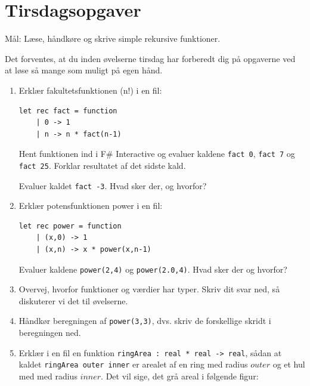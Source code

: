 \documentclass[a4paper,12pt]{article}
\begin{document}
\newpage
\section{Tirsdagsopgaver}
\label{sec:tirsdagsopgaver}

Mål: Læse, håndkøre og skrive simple rekursive funktioner.

Det forventes, at du inden øvelserne tirsdag har forberedt dig på
opgaverne ved at løse så mange som muligt på egen hånd.

\begin{enumerate}[{1}T1]
 \item Erklær fakultetsfunktionen (n!) i en fil:
\begin{Verbatim}[baselinestretch=0.8]
let rec fact = function
    | 0 -> 1
    | n -> n * fact(n-1)
\end{Verbatim}

Hent funktionen ind i F\# Interactive og evaluer kaldene \verb|fact 0|,
\verb|fact 7| og \verb|fact 25|. Forklar resultatet af det sidste
kald.

  Evaluer kaldet \verb|fact -3|. Hvad sker der, og hvorfor?
\item Erklær potensfunktionen power i en fil:
\begin{Verbatim}[baselinestretch=0.8]
let rec power = function
    | (x,0) -> 1
    | (x,n) -> x * power(x,n-1)
\end{Verbatim}
  Evaluer kaldene \verb|power(2,4)| og
  \verb|power(2.0,4)|. Hvad sker der og hvorfor?
\item Overvej, hvorfor funktioner og værdier har typer. Skriv dit svar ned, så diskuterer vi det til øvelserne.
\item Håndkør beregningen af \verb|power(3,3)|, dvs. skriv de
  forskellige skridt i beregningen ned.

\item Erklær i en fil en funktion \verb|ringArea : real * real -> real|, sådan at kaldet \verb|ringArea outer inner| er arealet af en ring med radius $\mathit{outer}$ og et hul med med radius $\mathit{inner}$. Det vil sige, det grå areal i følgende figur:
  \begin{center}
  \end{center}


\end{enumerate}
\end{document}
